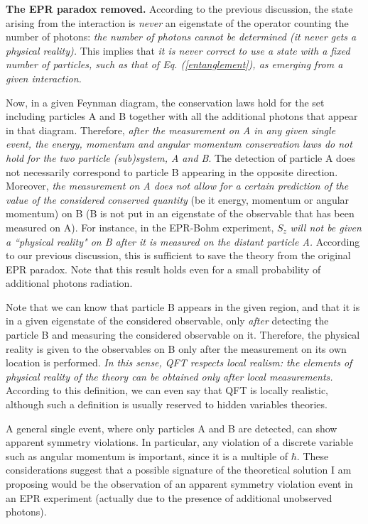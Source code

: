 \documentclass[aps,prl,showkeys,showpacs,preprint,groupedaddress,12pt]{revtex4}
\begin{document}
{\bf The EPR paradox removed.} According to the previous
discussion, the state arising from the interaction is {\it never}
an eigenstate of the operator counting the number of photons: {\it
the number of photons cannot be determined (it never gets a
physical reality).} This implies that {\it it is never correct to
use a state with a fixed number of particles, such as that of Eq.
(\ref{entanglement}), as emerging from a given interaction.}

Now, in a given Feynman diagram, the conservation laws hold for
the set including particles A and B together with all the
additional photons that appear in that diagram. Therefore, {\it
after the measurement on A in any given single event, the energy,
momentum and angular momentum conservation laws do not hold for
the two particle (sub)system, A and B}. The detection of particle
A does not necessarily correspond to particle B appearing in the
opposite direction. Moreover, {\it the measurement on A does not
allow for a certain prediction of the value of the considered
conserved quantity} (be it energy, momentum or angular momentum)
{on B (B is not put in an eigenstate of the observable that has
been measured on A).} For instance, in the EPR-Bohm experiment,
$S_z$ {\it will not be given a ``physical reality" on B after it
is measured on the distant particle A.} According to our previous
discussion, this is sufficient to save the theory from the
original EPR paradox. Note that this result holds even for a small
probability of additional photons radiation.

Note that we can know that particle B appears in the given region,
and that it is in a given eigenstate of the considered observable,
only {\it after} detecting the particle B and measuring the
considered observable on it. Therefore, the physical reality is
given to the observables on B only after the measurement on its
own location is performed. {\it In this sense, QFT respects local
realism: the elements of physical reality of the theory can be
obtained only after local measurements.} According to this
definition, we can even say that QFT is locally realistic,
although such a definition is usually reserved to hidden variables
theories.

A general single event, where only particles A and B are detected,
can show apparent symmetry violations. In particular, any
violation of a discrete variable such as angular momentum is
important, since it is a multiple of $\hbar$. These considerations
suggest that a possible signature of the theoretical solution I am
proposing would be the observation of an apparent symmetry
violation event in an EPR experiment (actually due to the presence
of additional unobserved photons).
\end{document}

